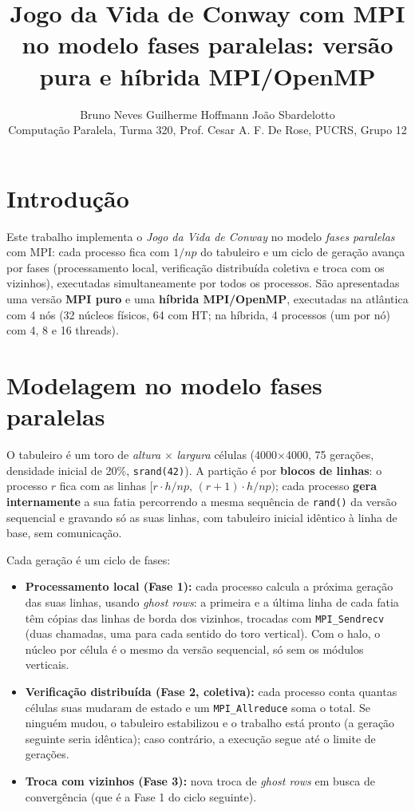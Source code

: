 \documentclass[10pt,twocolumn]{article}
\title{\vspace{-1.5cm}\large Jogo da Vida de Conway com MPI no modelo fases
paralelas: versão pura e híbrida MPI/OpenMP\vspace{-0.3cm}}
\author{
    \normalsize
    Bruno Neves \quad
    Guilherme Hoffmann \quad
    João Sbardelotto \\
    \small Computação Paralela, Turma 320, Prof. Cesar A. F. De Rose,
    PUCRS, Grupo 12
}
\date{}
\begin{document}
\maketitle
\vspace{-1.0cm}

\section{Introdução}
\label{sec:intro}

Este trabalho implementa o \emph{Jogo da Vida de Conway} no modelo
\emph{fases paralelas} com MPI: cada processo
fica com $1/np$ do tabuleiro e um ciclo de geração avança por fases
(processamento local, verificação distribuída coletiva e troca com os
vizinhos), executadas simultaneamente por todos os processos. São
apresentadas uma versão \textbf{MPI puro} e uma \textbf{híbrida
MPI/OpenMP}, executadas na atlântica com 4 nós (32 núcleos físicos, 64 com
HT; na híbrida, 4 processos (um por nó) com 4, 8 e 16 threads).

\section{Modelagem no modelo fases paralelas}
\label{sec:modelo}

O tabuleiro é um toro de \emph{altura} $\times$ \emph{largura} células
(4000$\times$4000, 75 gerações, densidade inicial de 20\%,
\texttt{srand(42)}). A partição é por \textbf{blocos de linhas}: o processo
$r$ fica com as linhas $[r\cdot h/np,\,(r{+}1)\cdot h/np)$; cada processo
\textbf{gera internamente} a sua fatia percorrendo a mesma sequência de
\texttt{rand()} da versão sequencial e gravando só as suas linhas, com
tabuleiro inicial idêntico à linha de base, sem comunicação.

Cada geração é um ciclo de fases:
\begin{itemize}\setlength{\itemsep}{0pt}
  \item \textbf{Processamento local (Fase 1):} cada processo calcula a próxima
        geração das suas linhas, usando \emph{ghost rows}: a primeira e a
        última linha de cada fatia têm cópias das linhas de borda dos
        vizinhos, trocadas com \texttt{MPI\_Sendrecv} (duas chamadas, uma para
        cada sentido do toro vertical). Com o halo, o núcleo por célula é o
        mesmo da versão sequencial, só sem os módulos verticais.
  \item \textbf{Verificação distribuída (Fase 2, coletiva):} cada processo
        conta quantas células suas mudaram de estado e um
        \texttt{MPI\_Allreduce} soma o total. Se ninguém mudou, o tabuleiro
        estabilizou e o trabalho está pronto (a geração seguinte seria
        idêntica); caso contrário, a execução segue até o limite de gerações.
  \item \textbf{Troca com vizinhos (Fase 3):} nova troca de \emph{ghost rows}
        em busca de convergência (que é a Fase 1 do ciclo seguinte).
\end{itemize}
\end{document}
